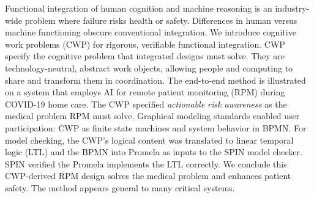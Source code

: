 Functional integration of human cognition and machine reasoning is an industry-wide problem where failure risks health or safety.
Differences in human versus machine functioning obscure conventional integration. 
We introduce cognitive work problems (CWP) for rigorous, verifiable functional integration. 
CWP specify the cognitive problem that integrated designs must solve. 
They are technology-neutral, abstract work objects, allowing people and computing to share and transform them in coordination.
The end-to-end method is illustrated on a system that employs AI for remote patient monitoring (RPM) during COVID-19 home care. 
The CWP specified \emph{actionable risk awareness} as the medical problem RPM must solve.
Graphical modeling standards enabled user participation: CWP as finite state machines and system behavior in BPMN. 
For model checking, the CWP’s logical content was translated to linear temporal logic (LTL) and the BPMN into Promela as inputs to the SPIN model checker. 
SPIN verified the Promela implements the LTL correctly.
We conclude this CWP-derived RPM design solves the medical problem and enhances patient safety. 
The method appears general to many critical systems.

